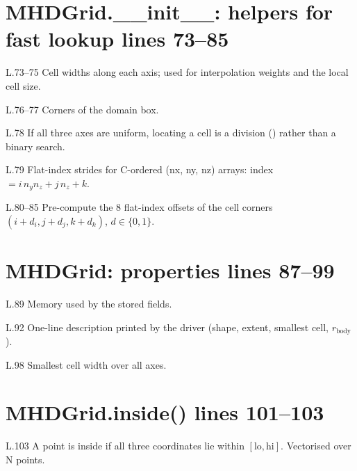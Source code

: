 \section*{\normalsize MHDGrid.\_\_init\_\_: helpers for fast lookup \hfill{\small\mdseries\color{gray}lines 73--85}}

\begin{lines}
\item[L.73–75] Cell widths along each axis; used for interpolation weights and the local cell size.
\item[L.76–77] Corners of the domain box.
\item[L.78] If all three axes are uniform, locating a cell is a division () rather than a binary search.
\item[L.79] Flat-index strides for C-ordered (nx, ny, nz) arrays: index $=i\,n_yn_z+j\,n_z+k$.
\item[L.80–85] Pre-compute the 8 flat-index offsets of the cell corners $(i+d_i, j+d_j, k+d_k)$, $d\in\{0,1\}$.
\end{lines}
\section*{\normalsize MHDGrid: properties \hfill{\small\mdseries\color{gray}lines 87--99}}

\begin{lines}
\item[L.89] Memory used by the stored fields.
\item[L.92] One-line description printed by the driver (shape, extent, smallest cell, $r_\text{body}$).
\item[L.98] Smallest cell width over all axes.
\end{lines}
\section*{\normalsize MHDGrid.inside() \hfill{\small\mdseries\color{gray}lines 101--103}}

\begin{lines}
\item[L.103] A point is inside if all three coordinates lie within $[\text{lo},\text{hi}]$. Vectorised over N points.
\end{lines}
